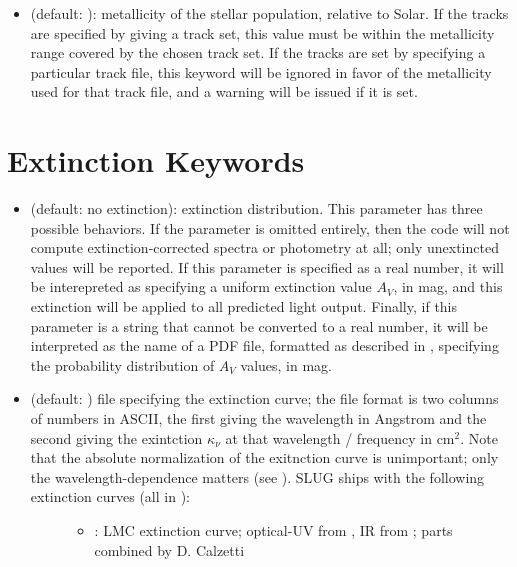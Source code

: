 \documentclass[letterpaper,10pt,english]{sphinxmanual}
\begin{document}
\begin{itemize}
\item {} 
 (default: ): metallicity of the stellar population, relative to Solar. If the tracks are specified by giving a track set, this value must be within the metallicity range covered by the chosen track set. If the tracks are set by specifying a particular track file, this keyword will be ignored in favor of the metallicity used for that track file, and a warning will be issued if it is set.

\end{itemize}


\section{Extinction Keywords}
\label{\detokenize{parameters:extinction-keywords}}\label{\detokenize{parameters:ssec-extinction-keywords}}\begin{itemize}
\item {} 
 (default: no extinction): extinction distribution. This parameter has three possible behaviors. If the parameter  is omitted entirely, then the code will not compute extinction-corrected spectra or photometry at all; only unextincted values will be reported. If this parameter is specified as a real number, it will be interepreted as specifying a uniform extinction value \(A_V\), in mag, and this extinction will be applied to all predicted light output. Finally, if this parameter is a string that cannot be converted to a real number, it will be interpreted as the name of a PDF file, formatted as described in {\hyperref[\detokenize{pdfs:sec-pdfs}]{}}, specifying the probability distribution of \(A_V\) values, in mag.

\item {} \begin{description}
\item[{ (default: ) file specifying the extinction curve; the file format is two columns of numbers in ASCII, the first giving the wavelength in Angstrom and the second giving the exintction \(\kappa_\nu\) at that wavelength / frequency in \(\mathrm{cm}^2\). Note that the absolute normalization of the exitnction curve is unimportant; only the wavelength-dependence matters (see {\hyperref[\detokenize{intro:ssec-spec-phot}]{}}). SLUG ships with the following extinction curves (all in ):}] \leavevmode\begin{itemize}
\item {} 
 : LMC extinction curve; optical-UV from , IR from ; parts combined by D. Calzetti


\end{itemize}
\end{description}
\end{itemize}
\end{document}
